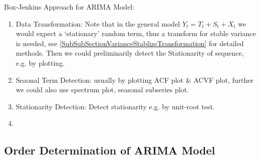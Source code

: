 \begin{point}
    Box-Jenkins Approach for ARIMA Model:
\end{point}

    \begin{enumerate}[topsep=2pt,itemsep=0pt]
        \item Data Transformation: Note that in the general model $ Y_t=T_t+S_t+X_t $ we would expect a `stationary' random term, thus a transform for stable variance is needed, see \autoref{SubSubSectionVarianceStablizeTransformation} for detailed methods. Then we could preliminarily detect the Stationarity of sequence, e.g. by plotting.
        \item Seaonal Term Detection: usually by plotting ACF plot \& ACVF plot, further we could also use spectrum plot, seasonal subseries plot.
        \item Stationarity Detection: Detect stationarity e.g. by unit-root test.
        \item 
    \end{enumerate}
    
\subsection{Order Determination of ARIMA Model}

